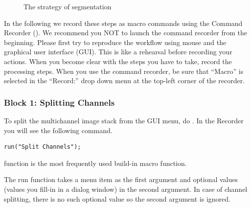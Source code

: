 \begin{figure}[!ht]
 \quad
 \caption{The strategy of segmentation}
 \label{fig:nucsegProc}
\end{figure}


In the following we record these steps as macro commands using the Command Recorder (). We recommend you NOT to launch the command recorder from the beginning. Please first try to reproduce the workflow using mouse and the graphical user interface (GUI). This is like a rehearsal before recording your actions. When you become clear with the steps you have to take, record the processing steps. When you use the command recorder, be sure that ``Macro'' is selected in the ``Record:'' drop down menu at the top-left corner of the recorder.

\subsubsection{Block 1: Splitting Channels}

To split the multichannel image stack from the GUI menu, do . In the Recorder you will see the following command. 
\begin{lstlisting}[numbers=none]
run("Split Channels");
\end{lstlisting}

 function is the most frequently used build-in macro function. 


The run function takes a menu item as the first argument and optional values (values you fill-in in a dialog window) in the second argument. In case of channel splitting, there is no such optional value so the second argument is ignored. 

